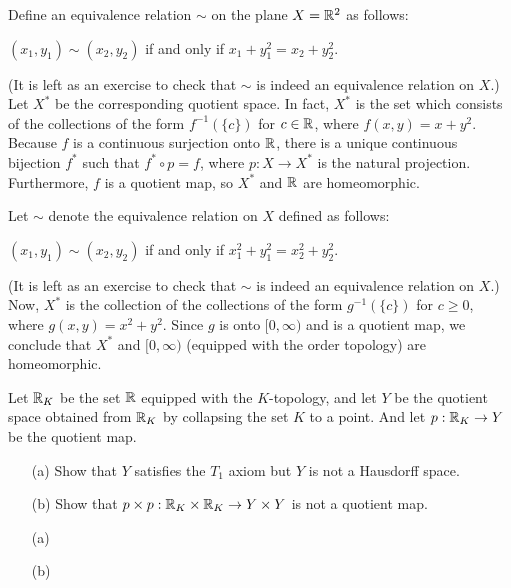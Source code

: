 \begin{exmp}
    Define an equivalence relation $\sim$ on the plane $X={\mathbb{R}}^2$ as follows:
    \begin{center}
        $(x_1, y_1)\sim(x_2, y_2)$ if and only if $x_1+y_1^2=x_2+y_2^2$.
    \end{center}
    \color{brown}(It is left as an exercise to check that $\sim$ is indeed an equivalence relation on $X$.) \color{black}
    Let $X^*$ be the corresponding quotient space.
    In fact, $X^*$ is the set which consists of the collections of the form $f^{-1}(\{c\})$ for $c\in{\mathbb{R}}$, where $f(x, y)=x+y^2$.
    Because $f$ is a continuous surjection onto ${\mathbb{R}}$, there is a unique continuous bijection $f^*$ such that $f^*\circ p=f$, where $p: X\rightarrow X^*$ is the natural projection.
    Furthermore, $f$ is a quotient map, so $X^*$ and ${\mathbb{R}}$ are homeomorphic.

    Let $\sim$ denote the equivalence relation on $X$ defined as follows:
    \begin{center}
        $(x_1, y_1)\sim(x_2, y_2)$ if and only if $x_1^2+y_1^2=x_2^2+y_2^2$.
    \end{center}
    \color{brown}(It is left as an exercise to check that $\sim$ is indeed an equivalence relation on $X$.) \color{black}
    Now, $X^*$ is the collection of the collections of the form $g^{-1}(\{c\})$ for $c\geq 0$, where $g(x, y)=x^2+y^2$.
    Since $g$ is onto $[0, \infty)$ and is a quotient map, we conclude that $X^*$ and $[0, \infty)$ (equipped with the order topology) are homeomorphic.
\end{exmp}

\begin{prob}
    Let ${\mathbb{R}}_K$ be the set ${\mathbb{R}}$ equipped with the $K$-topology, and let $Y$ be the quotient space obtained from ${\mathbb{R}}_K$ by collapsing the set $K$ to a point.
    And let $p: {\mathbb{R}}_K\rightarrow Y$ be the quotient map.
    \begin{enumerate}
        \item[(a)]
        {
            Show that $Y$ satisfies the $T_1$ axiom but $Y$ is not a Hausdorff space.
        }
        \item[(b)]
        {
            Show that $p\times p: {\mathbb{R}}_K\times{\mathbb{R}}_K\rightarrow Y\times Y$ is not a quotient map.
        }
    \end{enumerate}
\end{prob}
\begin{sol}
    \begin{enumerate}
        \item[(a)]
        {
            
        }
        \item[(b)]
        {

        }
    \end{enumerate}
\end{sol}